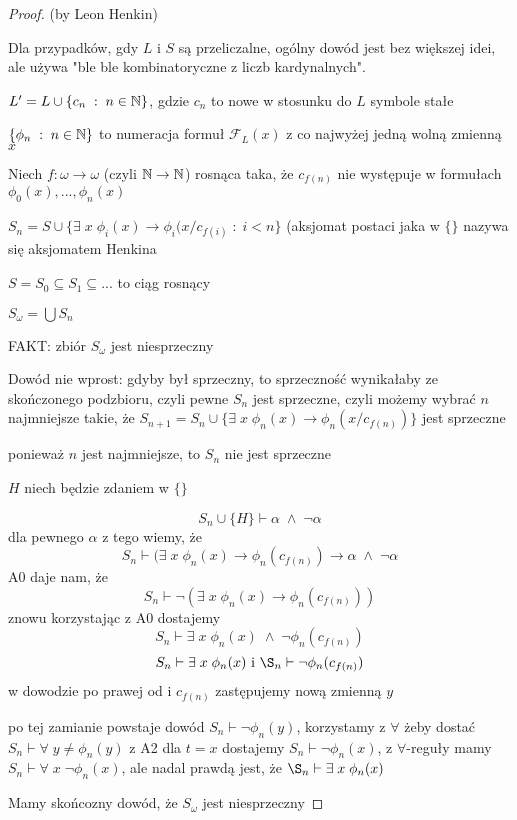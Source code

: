\begin{proof}
  (by Leon Henkin)

  Dla przypadków, gdy $L$ i $S$ są przeliczalne, ogólny dowód jest bez większej idei, ale używa "ble ble kombinatoryczne z liczb kardynalnych".

  $L'=L\cup\{c_n\;:\;n\in\mathbb{N}\}$, gdzie $c_n$ to nowe w stosunku do $L$ symbole stałe

  $\{\phi_n\;:\;n\in\mathbb{N}\}$ to numeracja formuł $\mathcal{F}_L(x)$ z co najwyżej jedną wolną zmienną $x$

  Niech $f:\omega\to\omega$ (czyli $\mathbb{N}\to\mathbb{N}$) rosnąca taka, że $c_{f(n)}$ nie występuje w formułach $\phi_0(x),...,\phi_n(x)$

  $S_n=S\cup\{\exists\;x\;\phi_i(x)\to\phi_i(x/c_{f(i)}\;:\;i<n\}$ (aksjomat postaci jaka w $\{\}$ nazywa się aksjomatem Henkina

  $S=S_0\subseteq S_1\subseteq...$ to ciąg rosnący
  
  $S_\omega=\bigcup S_n$

  FAKT: zbiór $S_\omega$ jest niesprzeczny

  Dowód nie wprost: gdyby był sprzeczny, to sprzeczność wynikałaby ze skończonego podzbioru, czyli pewne $S_n$ jest sprzeczne, czyli możemy wybrać $n$ najmniejsze takie, że $S_{n+1}=S_n\cup\{\exists\;x\;\phi_n(x)\to\phi_n(x/c_{f(n)})\}$ jest sprzeczne

  ponieważ $n$ jest najmniejsze, to $S_n$ nie jest sprzeczne

  $H$ niech będzie zdaniem w $\{\}$

  $$S_n\cup\{H\}\vdash \alpha\;\land\;\neg\alpha$$
  dla pewnego $\alpha$
  z tego wiemy, że
  $$S_n\vdash(\exists\;x\;\phi_n(x)\to\phi_n(c_{f(n)})\to\alpha\;\land\;\neg\alpha$$
  A0 daje nam, że 
  $$S_n\vdash \neg(\exists\;x\;\phi_n(x)\to\phi_n(c_{f(n)}))$$
  znowu korzystając z A0 dostajemy
  $$S_n\vdash\exists\;x\;\phi_n(x)\;\land\;\neg\phi_n(c_{f(n)})$$
  $$S_n\vdash\exists\;x\;\phi_n(x)\text{ i } \S_n\vdash\neg\phi_n(c_{f(n)})$$
  w dowodzie po prawej od i $c_{f(n)}$ zastępujemy nową zmienną $y$

  po tej zamianie powstaje dowód $S_n\vdash \neg\phi_n(y)$, korzystamy z $\forall$ żeby dostać $S_n\vdash\forall\;y\neq\phi_n(y)$ z A2 dla $t=x$ dostajemy $S_n\vdash\neg\phi_n(x)$, z $\forall$-reguły mamy $S_n\vdash\forall\;x\;\neg\phi_n(x)$, ale nadal prawdą jest, że $\S_n\vdash\exists\;x\;\phi_n(x)$

  Mamy skońcozny dowód, że $S_\omega$ jest niesprzeczny


\end{proof}
